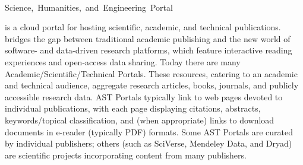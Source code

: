 \documentclass[10pt,letterpaper]{article}
\begin{document}
\vspace*{-6em}

\begin{center}
{}\\
\vspace{8pt}
\mbox{{\Large Science, Humanities, and Engineering Portal}}\\\vspace{3pt}
\end{center}

\vspace*{-2em}

{\lfMOSAIC} is a cloud portal for hosting scientific, academic, and 
technical publications.  {\lfMOSAIC} bridges the gap between 
traditional academic publishing and the new 
world of software- and data-driven research platforms, 
which feature interactive reading experiences 
and open-access data sharing.
\p{}
Today there are many Academic/Scientific/Technical Portals.
These resources, catering 
to an academic and technical audience, aggregate 
research articles, books, journals, and publicly accessible 
research data.  
AST Portals typically link to web pages devoted to individual 
publications, with each page displaying citations, 
abstracts, keywords/topical classification, and 
(when appropriate) links to download documents  
in e-reader (typically PDF) formats.  
Some AST Portals are curated by 
individual publishers; others (such as SciVerse, Mendeley Data, 
and Dryad) are scientific projects  
incorporating content from many publishers.
\end{document}
